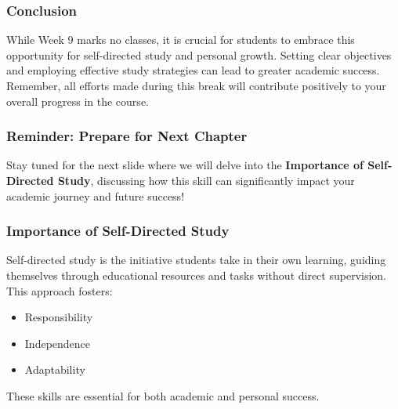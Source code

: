 \documentclass[aspectratio=169]{beamer}
\begin{document}
\begin{frame}[fragile]
    \frametitle{Conclusion}
    While Week 9 marks no classes, it is crucial for students to embrace this opportunity for self-directed study and personal growth. Setting clear objectives and employing effective study strategies can lead to greater academic success. Remember, all efforts made during this break will contribute positively to your overall progress in the course.
\end{frame}

\begin{frame}[fragile]
    \frametitle{Reminder: Prepare for Next Chapter}
    Stay tuned for the next slide where we will delve into the \textbf{Importance of Self-Directed Study}, discussing how this skill can significantly impact your academic journey and future success!
\end{frame}

\begin{frame}[fragile]
    \frametitle{Importance of Self-Directed Study}
    Self-directed study is the initiative students take in their own learning, guiding themselves through educational resources and tasks without direct supervision. This approach fosters:
    \begin{itemize}
        \item Responsibility
        \item Independence
        \item Adaptability
    \end{itemize}
    These skills are essential for both academic and personal success.
\end{frame}
\end{document}

